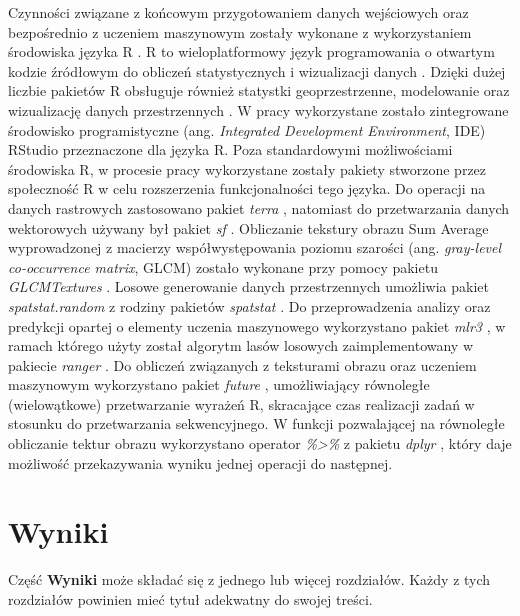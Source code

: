 \documentclass{amuthesis}
\begin{document}
Czynności związane z końcowym przygotowaniem danych wejściowych oraz
bezpośrednio z uczeniem maszynowym zostały wykonane z wykorzystaniem
środowiska języka R \autocite{R-base}. R to wieloplatformowy język
programowania o otwartym kodzie źródłowym do obliczeń statystycznych i
wizualizacji danych \autocite{lovelace_2019_geocomputation}. Dzięki
dużej liczbie pakietów R obsługuje również statystki geoprzestrzenne,
modelowanie oraz wizualizację danych przestrzennych
\autocite{lovelace_2019_geocomputation}. W pracy wykorzystane zostało
zintegrowane środowisko programistyczne (ang. \emph{Integrated
Development Environment}, IDE) RStudio
\autocite{rstudio_team_2020_rstudio} przeznaczone dla języka R. Poza
standardowymi możliwościami środowiska R, w procesie pracy wykorzystane
zostały pakiety stworzone przez społeczność R w celu rozszerzenia
funkcjonalności tego języka. Do operacji na danych rastrowych
zastosowano pakiet \emph{terra} \autocite{R-terra}, natomiast do
przetwarzania danych wektorowych używany był pakiet \emph{sf}
\autocite{R-sf}. Obliczanie tekstury obrazu Sum Average wyprowadzonej z
macierzy współwystępowania poziomu szarości (ang. \emph{gray-level
co-occurrence matrix}, GLCM) zostało wykonane przy pomocy pakietu
\emph{GLCMTextures} \autocite{R-GLCMTextures}. Losowe generowanie danych
przestrzennych umożliwia pakiet \emph{spatstat.random}
\autocite{R-spatstat.random} z rodziny pakietów \emph{spatstat}
\autocite{R-spatstat}. Do przeprowadzenia analizy oraz predykcji opartej
o elementy uczenia maszynowego wykorzystano pakiet \emph{mlr3}
\autocite{R-mlr3}, w ramach którego użyty został algorytm lasów losowych
zaimplementowany w pakiecie \emph{ranger} \autocite{R-ranger}. Do
obliczeń związanych z teksturami obrazu oraz uczeniem maszynowym
wykorzystano pakiet \emph{future} \autocite{R-future}, umożliwiający
równoległe (wielowątkowe) przetwarzanie wyrażeń R, skracające czas
realizacji zadań w stosunku do przetwarzania sekwencyjnego. W funkcji
pozwalającej na równoległe obliczanie tektur obrazu wykorzystano
operator \emph{\%\textgreater\%} z pakietu \emph{dplyr}
\autocite{R-dplyr}, który daje możliwość przekazywania wyniku jednej
operacji do następnej.


\hypertarget{sec-wyniki}{%
\chapter{Wyniki}\label{sec-wyniki}}

Część \textbf{Wyniki} może składać się z jednego lub więcej rozdziałów.
Każdy z tych rozdziałów powinien mieć tytuł adekwatny do swojej treści.
\end{document}
